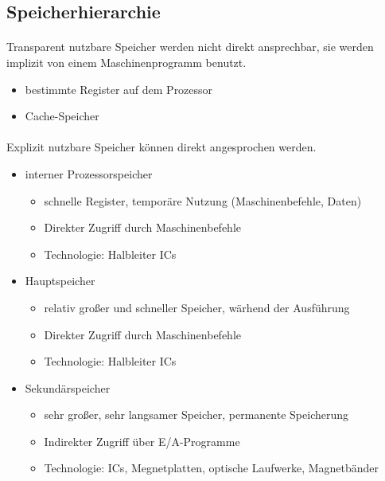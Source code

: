 	\subsection{Speicherhierarchie}
		\paragraph{} Transparent nutzbare Speicher werden nicht direkt ansprechbar, sie werden implizit
		von einem Maschinenprogramm benutzt.
		\begin{itemize}
			\item bestimmte Register auf dem Prozessor
			\item Cache-Speicher
		\end{itemize}

		\paragraph{} Explizit nutzbare Speicher können direkt angesprochen werden.
		\begin{itemize}
			\item interner Prozessorspeicher
				\begin{itemize}
					\item schnelle Register, temporäre Nutzung (Maschinenbefehle, Daten)
					\item Direkter Zugriff durch Maschinenbefehle
					\item Technologie: Halbleiter ICs
				\end{itemize}

			\item Hauptspeicher
				\begin{itemize}
					\item relativ großer und schneller Speicher, wärhend der Ausführung
					\item Direkter Zugriff durch Maschinenbefehle
					\item Technologie: Halbleiter ICs
				\end{itemize}

			\item Sekundärspeicher
				\begin{itemize}
					\item sehr großer, sehr langsamer Speicher, permanente Speicherung
					\item Indirekter Zugriff über E/A-Programme
					\item Technologie: ICs, Megnetplatten, optische Laufwerke, Magnetbänder
				\end{itemize}
		\end{itemize}

